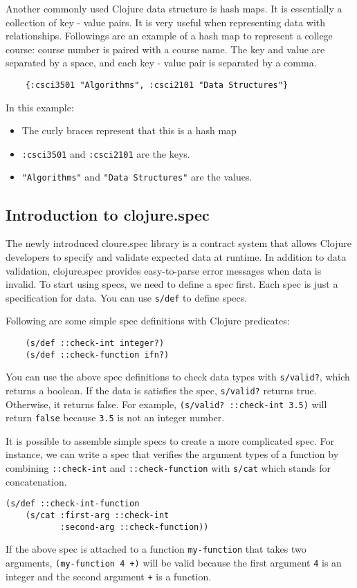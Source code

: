 \documentclass[12pt]{article}
\newcommand{\comment}[1]{{\bf \tt  {#1}}}
\newcommand{\emcomment}[1]{\textcolor{ForestGreen}{\comment{Elena: {#1}}}}
\newcommand{\tscomment}[1]{\textcolor{Teal}{\comment{Tony: {#1}}}}
\begin{document}
	Another commonly used Clojure data structure is hash maps. It is essentially a collection of key - value pairs. 
	It is very useful when representing data with relationships. Followings are an example of a hash map to 
	represent a college course: course number is paired with a course name. 
	The key and value are separated by a space, and each key - value pair is 
	separated by a comma.
	\begin{verbatim}
	{:csci3501 "Algorithms", :csci2101 "Data Structures"}
	\end{verbatim}
	In this example:
	\begin{itemize}
	\item The curly braces represent that this is a hash map
	\item {\tt :csci3501} and {\tt :csci2101} are the keys.
	\item {\tt "Algorithms"} and {\tt  "Data Structures"} are the values.
	\end{itemize}
	
	\subsection{Introduction to clojure.spec}
	The newly introduced cloure.spec library is a contract system that allows Clojure developers to specify and validate expected data 
	at runtime. In addition to data validation, clojure.spec provides easy-to-parse error messages when data is invalid. 
	To start using specs, we need to define a spec first. Each spec is just a specification for data.
	You can use \texttt{s/def} to define specs.

	Following are some simple spec definitions with Clojure predicates:
	\begin{verbatim}
	(s/def ::check-int integer?)
	(s/def ::check-function ifn?)
	\end{verbatim}
	You can use the above spec definitions to check data types with {\tt s/valid?}, which returns a boolean.
	If the data is satisfies the spec, {\tt s/valid?} returns true. Otherwise, it returns false. For example, 
	{\tt (s/valid? ::check-int 3.5)} will return {\tt false} because {\tt 3.5} is not an integer number.
	
	It is possible to assemble simple specs to create a more complicated spec. For instance, we can write a spec that verifies 
	the argument types of a function by combining \texttt{::check-int} and \texttt{::check-function} with \texttt{s/cat} 
	which stands for concatenation. 
	\begin{verbatim}
(s/def ::check-int-function 
    (s/cat :first-arg ::check-int 
           :second-arg ::check-function))
	\end{verbatim}
	If the above spec is attached to a function {\tt my-function} that takes two arguments, 
	{\tt (my-function 4 +)} will be valid 
	because the first argument {\tt 4} is an integer and the second argument {\tt +} is a function.
	
\end{document}
